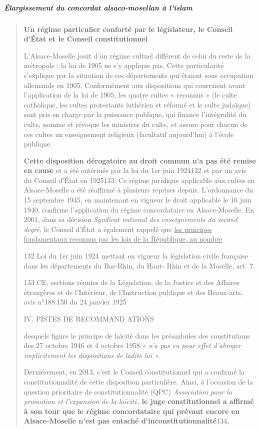 \hypertarget{uxe9largissement-du-concordat-alsaco-mosellan-uxe0-lislam}{%
\subparagraph{Élargissement du concordat alsaco-mosellan à
l'islam}\label{uxe9largissement-du-concordat-alsaco-mosellan-uxe0-lislam}}

\begin{quote}
\textbf{Un régime particulier conforté par le législateur, le Conseil
d'État et le Conseil constitutionnel}

L'Alsace-Moselle jouit d'un régime cultuel différent de celui du reste
de la métropole : la loi de 1905 ne s'y applique pas. Cette
particularité s'explique par la situation de ces départements qui
étaient sous occupation allemande en 1905. Conformément aux dispositions
qui courraient avant l'application de la loi de 1905, les quatre cultes
« reconnus » (le culte catholique, les cultes protestants luthérien et
réformé et le culte judaïque) sont pris en charge par la puissance
publique, qui finance l'intégralité du culte, nomme et révoque les
ministres du culte, et assure pour chacun de ces cultes un enseignement
religieux (facultatif aujourd'hui) à l'école publique.

\textbf{Cette disposition dérogatoire au droit commun n'a pas été remise
en cause} et a été entérinée par la loi du 1er juin 1924132 et par un
avis du Conseil d'État en 1925133. Ce régime juridique applicable aux
cultes en Alsace-Moselle a été réaffirmé à plusieurs reprises depuis.
L'ordonnance du 15 septembre 1945, en maintenant en vigueur le droit
applicable le 16 juin 1940, confirme l'application du régime
concordataire en Alsace-Moselle. En 2001, dans sa décision
\emph{Syndicat national des enseignements du second degré,} le Conseil
d'État a également rappelé que \underline{les principes fondamentaux
reconnus par les lois de la République, au nombre}

132 Loi du 1er juin 1924 mettant en vigueur la législation civile
française dans les départements du Bas-Rhin, du Haut- Rhin et de la
Moselle, art. 7.

133 CE, sections réunies de la Législation, de la Justice et des
Affaires étrangères et de l'Intérieur, de l'Instruction publique et des
Beaux-arts, avis n°188.150 du 24 janvier 1925

IV. PISTES DE RECOMMAND ATIONS

desquels figure le principe de laïcité dans les préambules des
constitutions des 27 octobre 1946 et 4 octobre 1958 \emph{« n'a pas eu
pour effet d'abroger implicitement les dispositions de ladite loi ».}

Dernièrement, en 2013, c'est le Conseil constitutionnel qui a confirmé
la constitutionnalité de cette disposition particulière. Ainsi, à
l'occasion de la question prioritaire de constitutionnalité (QPC)
\emph{Association pour la promotion et l'expansion de la laïcité,}
\textbf{le juge constitutionnel a affirmé à son tour que le régime
concordataire qui prévaut encore en Alsace-Moselle n'est pas entaché
d'inconstitutionnalité}134\textbf{.}
\end{quote}


